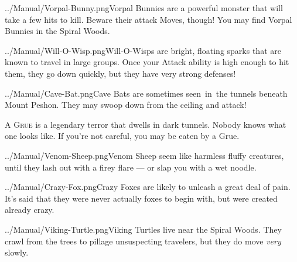 \documentclass[10pt,twocolumn,openany,article]{memoir}
\begin{document}
{\vspace{14pt}

\lettrine[image=true,                lines=5,               findent=3pt,
nindent=3pt]{../Manual/Vorpal-Bunny.png}{}Vorpal Bunnies  are a powerful
monster that  will take a few  hits to kill. Beware  their attack Moves,
though! You may find Vorpal Bunnies in the Spiral Woods.

\pagebreak

\lettrine[image=true,                lines=5,               findent=3pt,
nindent=3pt]{../Manual/Will-O-Wisp.png}{}Will-O-Wisps     are    bright,
floating sparks  that are  known to  travel in  large groups.  Once your
Attack ability  is high enough  to hit them,  they go down  quickly, but
they have very strong defenses!

\vspace{14pt}

\lettrine[image=true,                lines=5,               findent=3pt,
nindent=3pt]{../Manual/Cave-Bat.png}{}Cave     Bats    are     sometimes
seen~in~the tunnels beneath  Mount Peshon. They may swoop  down from the
ceiling and attack!

\vspace{14pt}

\textsc{A  Grue} is  a legendary  terror  that dwells  in dark  tunnels.
Nobody knows  what one  looks like.  If you're not  careful, you  may be
eaten by a Grue.

\vspace{14pt}

\lettrine[image=true,                lines=5,               findent=3pt,
nindent=3pt]{../Manual/Venom-Sheep.png}{}Venom Sheep  seem like harmless
fluffy creatures, until they lash out with a firey flare --- or slap you
with a wet noodle.

\vspace{14pt}

\lettrine[image=true,                lines=5,               findent=3pt,
nindent=3pt]{../Manual/Crazy-Fox.png}{}Crazy Foxes are likely to unleash
a great deal of  pain. It's said that they were  never actually foxes to
begin with, but were created already crazy.

\ifdefined\ATARIAGESAVE\pagebreak\else\vspace{14pt}\fi

\lettrine[image=true,                lines=5,               findent=3pt,
nindent=3pt]{../Manual/Viking-Turtle.png}{}Viking Turtles  live near the
Spiral  Woods.  They  crawl  from  the  trees  to  pillage  unsuspecting
travelers, but they do move \emph{very} slowly.

}
\end{document}
